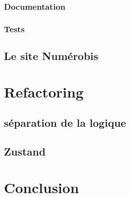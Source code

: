 \documentclass[a4paper,12pt]{report}
\begin{document}
\subsubsection{Documentation}

\subsubsection{Tests}

\subsection{Le site Numérobis}

\section{Refactoring}

\subsection{séparation de la logique}

\subsection{Zustand}

\section{Conclusion}
\end{document}
